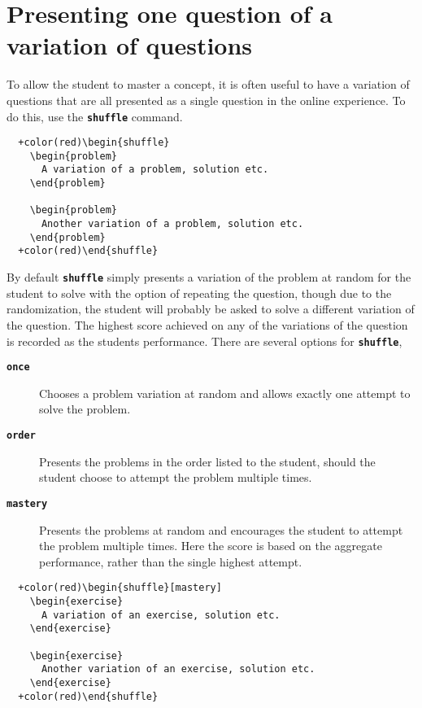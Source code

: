 \documentclass{amsart}
\newcommand\code[1]{{\bfseries\texttt{#1}}}
\begin{document}
\section{Presenting one question of a variation of questions}

To allow the student to master a concept, it is often useful to have a
variation of questions that are all presented as a single question in the
online experience. To do this, use the \code{shuffle} command.


\begin{Verbatim}
  +color(red)\begin{shuffle}
    \begin{problem}
      A variation of a problem, solution etc.
    \end{problem}
    
    \begin{problem}
      Another variation of a problem, solution etc.
    \end{problem}
  +color(red)\end{shuffle}
\end{Verbatim}

By default \code{shuffle} simply presents a variation of the problem
at random for the student to solve with the option of repeating the
question, though due to the randomization, the student will probably
be asked to solve a different variation of the question. The highest
score achieved on any of the variations of the question is recorded as
the students performance. There are several options for
\code{shuffle},
\begin{description}
\item[\code{once}] Chooses a problem variation at random and allows
  exactly one attempt to solve the problem.
\item[\code{order}] Presents the problems in the order listed to the student, should the student choose to attempt the problem multiple times. 
\item[\code{mastery}] Presents the problems at random and encourages
  the student to attempt the problem multiple times. Here the score is
  based on the aggregate performance, rather than the single highest
  attempt.
\end{description}


\begin{Verbatim}
  +color(red)\begin{shuffle}[mastery]
    \begin{exercise}
      A variation of an exercise, solution etc.
    \end{exercise}
    
    \begin{exercise}
      Another variation of an exercise, solution etc.
    \end{exercise}
  +color(red)\end{shuffle}
\end{Verbatim}
\end{document}
